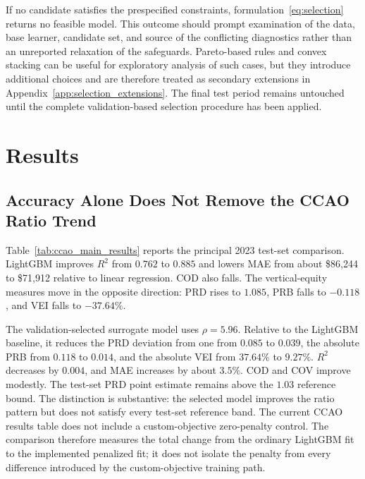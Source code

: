 \documentclass[10pt]{article}
\theoremstyle{definition}
\newcommand{\1}{\mathbf{1}}
\begin{document}
{{{If no candidate satisfies the prespecified constraints, formulation~\eqref{eq:selection} returns no feasible model. This outcome should prompt examination of the data, base learner, candidate set, and source of the conflicting diagnostics rather than an unreported relaxation of the safeguards. Pareto-based rules and convex stacking can be useful for exploratory analysis of such cases, but they introduce additional choices and are therefore treated as secondary extensions in Appendix~\ref{app:selection_extensions}. The final test period remains untouched until the complete validation-based selection procedure has been applied.




}







\section{Results}
\label{sec:results}

\subsection{Accuracy Alone Does Not Remove the CCAO Ratio Trend}
\label{subsec:ccao_baseline_results}

Table~\ref{tab:ccao_main_results} reports the principal 2023 test-set comparison. LightGBM improves $R^2$ from $0.762$ to $0.885$ and lowers MAE from about \$86,244 to \$71,912 relative to linear regression. COD also falls. The vertical-equity measures move in the opposite direction: PRD rises to $1.085$, PRB falls to $-0.118$, and VEI falls to $-37.64\%$.

The validation-selected surrogate model uses $\rho=5.96$. Relative to the LightGBM baseline, it reduces the PRD deviation from one from $0.085$ to $0.039$, the absolute PRB from $0.118$ to $0.014$, and the absolute VEI from $37.64\%$ to $9.27\%$. $R^2$ decreases by $0.004$, and MAE increases by about $3.5\%$. COD and COV improve modestly. The test-set PRD point estimate remains above the $1.03$ reference bound. The distinction is substantive: the selected model improves the ratio pattern but does not satisfy every test-set reference band. The current CCAO results table does not include a custom-objective zero-penalty control. The comparison therefore measures the total change from the ordinary LightGBM fit to the implemented penalized fit; it does not isolate the penalty from every difference introduced by the custom-objective training path.

}}
\end{document}
